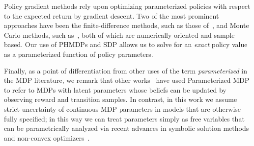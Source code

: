 Policy gradient methods rely upon optimizing parameterized policies with respect to the expected return by gradient descent. 
Two of the most prominent approaches have been the finite-difference methods, such as those of~\cite{Ng_UAI_2000}, and Monte Carlo methods, such as~\cite{Sutton_NIPS_1999,Baxter_ISCAS_2000}, both of which are numerically oriented and sample based. Our use of PHMDPs and SDP allows us to solve for an \textit{exact} policy value as a parameterized function of policy parameters.

Finally, as a point of differentiation from other uses of the term \emph{parameterized} in the MDP literature, we remark that other works~\cite{Doshi-VelezK16,Duff_UMA_2002,Dearden_UAI_1999,Gopalan_COLT_2015} have used Parameterized MDP to refer to MDPs with latent parameters whose beliefs can be updated by observing reward and transition samples. In contrast, in this work we assume strict uncertainty of continuous MDP parameters in models that are otherwise fully specified; in this way we can treat parameters simply as free variables that can be parametrically analyzed via recent advances in symbolic solution methods and non-convex optimizers~\cite{Gao2013}.



